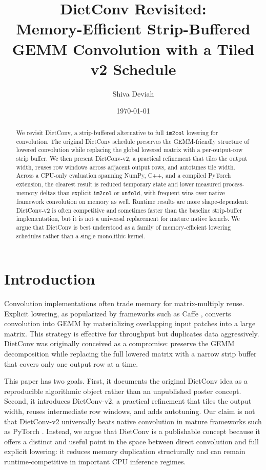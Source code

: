 \documentclass[11pt]{article}
\title{DietConv Revisited:\\Memory-Efficient Strip-Buffered GEMM Convolution with a Tiled v2 Schedule}
\author{Shiva Deviah}
\date{\today}
\begin{document}
\maketitle

\begin{abstract}
We revisit DietConv, a strip-buffered alternative to full \texttt{im2col} lowering for convolution. The original DietConv schedule preserves the GEMM-friendly structure of lowered convolution while replacing the global lowered matrix with a per-output-row strip buffer. We then present DietConv-v2, a practical refinement that tiles the output width, reuses row windows across adjacent output rows, and autotunes tile width. Across a CPU-only evaluation spanning NumPy, C++, and a compiled PyTorch extension, the clearest result is reduced temporary state and lower measured process-memory deltas than explicit \texttt{im2col} or \texttt{unfold}, with frequent wins over native framework convolution on memory as well. Runtime results are more shape-dependent: DietConv-v2 is often competitive and sometimes faster than the baseline strip-buffer implementation, but it is not a universal replacement for mature native kernels. We argue that DietConv is best understood as a family of memory-efficient lowering schedules rather than a single monolithic kernel.
\end{abstract}

\section{Introduction}
Convolution implementations often trade memory for matrix-multiply reuse. Explicit lowering, as popularized by frameworks such as Caffe \citep{jia2014caffe}, converts convolution into GEMM by materializing overlapping input patches into a large matrix. This strategy is effective for throughput but duplicates data aggressively. DietConv was originally conceived as a compromise: preserve the GEMM decomposition while replacing the full lowered matrix with a narrow strip buffer that covers only one output row at a time.

This paper has two goals. First, it documents the original DietConv idea as a reproducible algorithmic object rather than an unpublished poster concept. Second, it introduces DietConv-v2, a practical refinement that tiles the output width, reuses intermediate row windows, and adds autotuning. Our claim is not that DietConv-v2 universally beats native convolution in mature frameworks such as PyTorch \citep{paszke2019pytorch}. Instead, we argue that DietConv is a publishable concept because it offers a distinct and useful point in the space between direct convolution and full explicit lowering: it reduces memory duplication structurally and can remain runtime-competitive in important CPU inference regimes.
\end{document}
